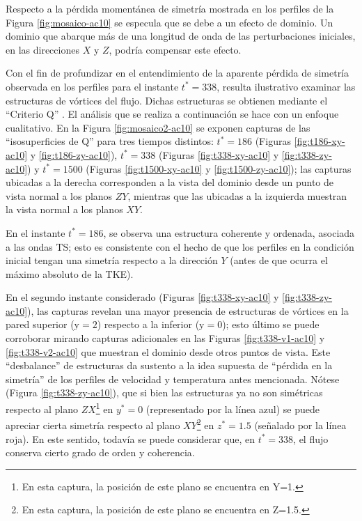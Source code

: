 Respecto a la pérdida momentánea de simetría mostrada en los perfiles de la Figura \ref{fig:mosaico-ac10}  se especula que se debe a un efecto de dominio. Un dominio que abarque más de una longitud de onda de las perturbaciones iniciales, en las direcciones $X$ y $Z$, podría compensar este efecto. %

Con el fin de profundizar en el entendimiento de la aparente pérdida de simetría observada en los perfiles para el instante $t^* = 338$, resulta ilustrativo examinar las estructuras de vórtices del flujo. Dichas estructuras se obtienen mediante el ``Criterio Q'' \cite{hunt1988eddies}. El análisis que se realiza a continuación se hace con un enfoque cualitativo. En la Figura \ref{fig:mosaico2-ac10} se exponen capturas de las ``isosuperficies de Q'' para tres tiempos distintos: $t^* = 186$ (Figuras \ref{fig:t186-xy-ac10} y  \ref{fig:t186-zy-ac10}),  $t^* = 338$  (Figuras \ref{fig:t338-xy-ac10} y  \ref{fig:t338-zy-ac10}) y  $t^* = 1500$  (Figuras \ref{fig:t1500-xy-ac10} y  \ref{fig:t1500-zy-ac10}); las capturas ubicadas a la derecha corresponden a la vista del dominio desde un punto de vista normal a los planos $ZY$, mientras que las ubicadas a la izquierda muestran la vista normal a los planos $XY$.

En el instante $t^* = 186$, se observa una estructura coherente y ordenada, asociada a las ondas TS; esto es consistente con el hecho de que los perfiles en la condición inicial tengan una simetría respecto a la dirección $Y$ (antes de que ocurra el máximo absoluto de la TKE). 

\newpage

En el segundo instante considerado (Figuras \ref{fig:t338-xy-ac10} y \ref{fig:t338-zy-ac10}), las capturas revelan una mayor presencia de estructuras de vórtices en la pared superior ($\text{y}=2$) respecto a la inferior ($\text{y}=0$); esto último se puede corroborar mirando capturas adicionales en las Figuras \ref{fig:t338-v1-ac10} y \ref{fig:t338-v2-ac10} que muestran el dominio desde otros puntos de vista. Este ``desbalance'' de estructuras da sustento a la idea supuesta de ``pérdida en la simetría'' de los perfiles de velocidad y temperatura antes mencionada. Nótese (Figura \ref{fig:t338-zy-ac10}), que si bien las estructuras ya no son simétricas respecto al plano $ZX$\footnote{En esta captura, la posición de este plano se encuentra en Y=1.} en $y^*=0$ (representado por la línea azul) se puede apreciar cierta simetría respecto al plano $XY$\footnote{En esta captura, la posición de este plano se encuentra en Z=1.5.} en $z^*= 1 \text{.} 5$ (señalado por la línea roja). En este sentido, todavía se puede considerar que, en $t^* = 338$, el flujo conserva cierto grado de orden y coherencia. 


